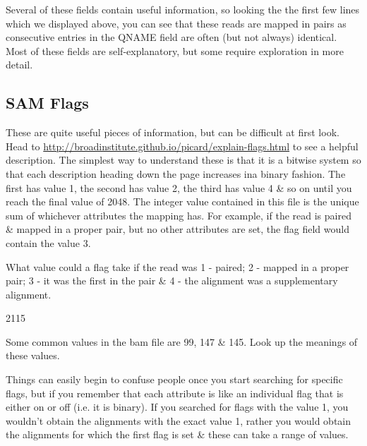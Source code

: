 \begin{note}
Several of these fields contain useful information, so looking the the first few lines which we displayed above, you can see that these reads are mapped in pairs as consecutive entries in the QNAME field are often (but not always) identical.
Most of these fields are self-explanatory, but some require exploration in more detail.
\end{note}

\subsection{SAM Flags}
\begin{information}
These are quite useful pieces of information, but can be difficult at first look.
Head to \url{http://broadinstitute.github.io/picard/explain-flags.html} to see a helpful description.
The simplest way to understand these is that it is a bitwise system so that each description heading down the page increases ina binary fashion.
The first has value 1, the second has value 2, the third has value 4 \& so on until you reach the final value of 2048.
The integer value contained in this file is the unique sum of whichever attributes the mapping has.
For example, if the read is paired \& mapped in a proper pair, but no other attributes are set, the flag field would contain the value 3.
\end{information}

\begin{questions}
What value could a flag take if the read was 1 - paired; 2 - mapped in a proper pair; 3 - it was the first in the pair \& 4 - the alignment was a supplementary alignment. \\
\begin{answer}
2115 \\
\end{answer}
Some common values in the bam file are 99, 147 \& 145.
Look up the meanings of these values. \\
\end{questions}

\begin{information}
Things can easily begin to confuse people once you start searching for specific flags, but if you remember that each attribute is like an individual flag that is either on or off (i.e. it is binary).
If you searched for flags with the value 1, you wouldn't obtain the alignments with the exact value 1, rather you would obtain the alignments for which the first flag is set \& these can take a range of values.
\end{information}

